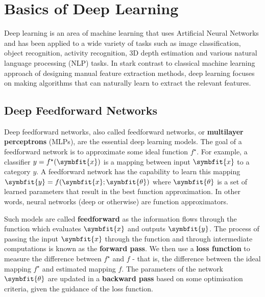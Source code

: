 \chapter{Basics of Deep Learning} \label{chap:basics-of-dl}

Deep learning is an area of machine learning that uses Artificial Neural Networks \parencite{mcculloch1943logical} and has been applied to a wide variety of tasks such as image classification, object recognition, activity recognition, 3D depth estimation and various natural language processing (NLP) tasks. In stark contrast to classical machine learning approach of designing manual feature extraction methods, deep learning focuses on making algorithms that can naturally learn to extract the relevant features.

\section{Deep Feedforward Networks} \label{sec:feed-forward-nets}

Deep feedforward networks, also called feedforward networks, or \textbf{multilayer perceptrons} (MLPs), are the essential deep learning models. The goal of a feedforward network is to approximate some ideal function \(f^\star\). 
For example, a classifier \(y = f^\star(\symbfit{x})\) is a mapping between input $\symbfit{x}$ to a category $y$. A feedforward network has the capability to learn this mapping \(\symbfit{y} = f(\symbfit{x}; \symbfit{\theta})\) where $\symbfit{\theta}$ is a set of learned parameters that result in the best function approximation. In other words, neural networks (deep or otherwise) are function approximators.

Such models are called \textbf{feedforward} as the information flows through the function which evaluates $\symbfit{x}$ and outputs $\symbfit{y}$. The process of passing the input $\symbfit{x}$ through the function and through intermediate computations is known as the \textbf{forward pass}. We then use a \textbf{loss function} to measure the difference between $f^\star$ and $f$ - that is, the difference between the ideal mapping $f^\star$ and estimated mapping $f$. The parameters of the network $\symbfit{\theta}$ are updated in a \textbf{backward pass} based on some optimisation criteria, given the guidance of the loss function. 

